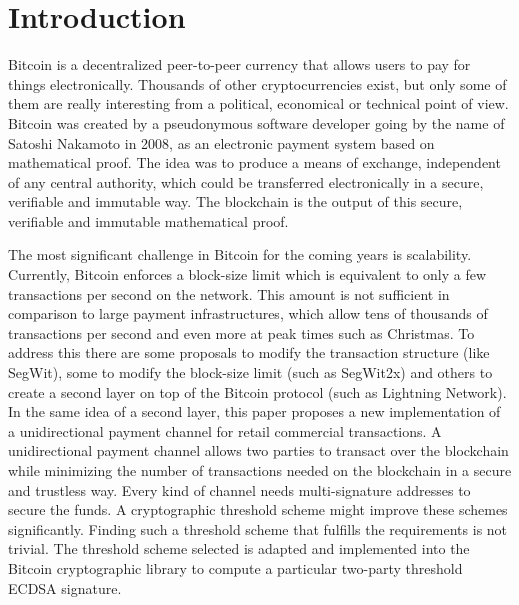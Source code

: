 \chapter{Introduction}
\label{chap:introduction}

Bitcoin is a decentralized peer-to-peer currency that allows users to pay for
things electronically. Thousands of other cryptocurrencies exist, but only some
of them are really interesting from a political, economical or technical point
of view. Bitcoin was created by a pseudonymous software developer going by the
name of Satoshi Nakamoto in 2008, as an electronic payment system based on
mathematical proof. The idea was to produce a means of exchange, independent of
any central authority, which could be transferred electronically in a secure,
verifiable and immutable way. The blockchain is the output of this secure,
verifiable and immutable mathematical proof.

The most significant challenge in Bitcoin for the coming years is scalability.
Currently, Bitcoin enforces a block-size limit which is equivalent to only a few
transactions per second on the network. This amount is not sufficient in
comparison to large payment infrastructures, which allow tens of thousands of
transactions per second and even more at peak times such as Christmas.  To
address this there are some proposals to modify the transaction structure (like
SegWit), some to modify the block-size limit (such as SegWit2x) and others to
create a second layer on top of the Bitcoin protocol (such as Lightning
Network). In the same idea of a second layer, this paper proposes a new
implementation of a unidirectional payment channel for retail commercial
transactions. A unidirectional payment channel allows two parties to
transact over the blockchain while minimizing the number of transactions needed
on the blockchain in a secure and trustless way. Every kind of channel needs
multi-signature addresses to secure the funds. A cryptographic threshold scheme
might improve these schemes significantly. Finding such a threshold scheme that
fulfills the requirements is not trivial. The threshold scheme selected is
adapted and implemented into the Bitcoin cryptographic library to compute a
particular two-party threshold ECDSA signature.


